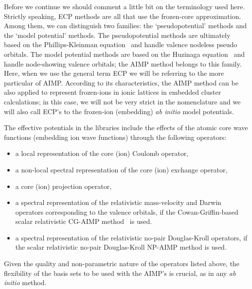Before we continue we should comment a little bit on the terminology used here.
Strictly speaking, ECP methods are all that use the frozen-core approximation.
Among them, we can distinguish two families: the `pseudopotential' methods
and the `model potential' methods.
The pseudopotential methods are ultimately based on the
Phillips-Kleinman equation~\cite{Phillips:59}
and handle valence nodeless pseudo orbitals.
The model potential methods are based on the Huzinaga
equation~\cite{Huzinaga:71,Huzinaga:73}
and handle node-showing valence orbitals;
the AIMP method belongs to this family.
Here, when we use the general term ECP  we will be referring to the more
particular of AIMP.
According to its characteristics,
the AIMP method can be also applied to represent
frozen-ions in ionic lattices in embedded cluster calculations;
in this case,
we will not be very strict in the nomenclature and we will also call ECP's
to the frozen-ion (embedding)  {\it ab initio} model potentials.

   The effective potentials in the libraries include the effects of the atomic
core wave functions (embedding ion wave functions) through the
following operators:
\begin{itemize}
\item a local representation of the core (ion) Coulomb operator,
\item a non-local spectral representation of the core (ion) exchange operator,
\item a core (ion) projection operator,
\item a spectral representation of the relativistic mass-velocity and
Darwin operators corresponding to the valence orbitals,
if the Cowan-Griffin-based scalar relativistic
CG-AIMP method~\cite{Barandiaran:90} is used.
\item a spectral representation of the relativistic no-pair Douglas-Kroll
operators, if the scalar relativistic no-pair Douglas-Kroll NP-AIMP method
\cite{Wittborn:95,Rakowitz:99a,Rakowitz:99b} is used.
\end{itemize}

Given the quality and non-parametric nature of the operators
listed above, the flexibility of the basis sets to be used
with the AIMP's is crucial, as in any {\it ab initio} method.

